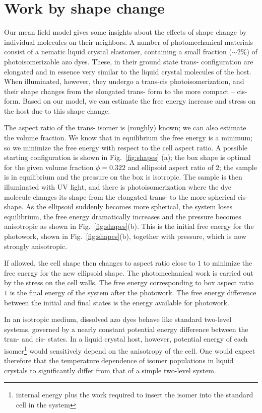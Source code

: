 \documentclass{article}
\begin{document}
\section{Work by shape change}

\label{Sec_Disscussion} Our mean field model gives some insights about the
effects of shape change by individual molecules on their neighbors. A number
of photomechanical materials consist of a nematic liquid crystal elastomer,
containing a small fraction ($\sim 2\%$) of photoisomerizable azo dyes.
These, in their ground state trans- configuration are elongated and in
essence very similar to the liquid crystal molecules of the host. When
illuminated, however, they undergo a trans-cis photoisomerization, and their
shape changes from the elongated trans- form to the more compact -- cis-
form. Based on our model, we can estimate the free energy increase and
stress on the host due to this shape change.

The aspect ratio of the trans- isomer is (roughly) known; we can also
estimate the volume fraction. We know that in equilibrium the free energy is
a minimum; so we minimize the free energy with respect to the cell aspect
ratio. A possible starting configuration is shown in Fig.~\ref{fig:shapes}%
(a); the box shape is optimal for the given volume fraction $\phi =0.322$
and ellipsoid aspect ratio of $2$; the sample is in equilibrium and the
pressure on the box is isotropic. The sample is then illuminated with UV
light, and there is photoisomerization where the dye molecule changes its
shape from the elongated trans- to the more spherical cis- shape. As the
ellipsoid suddenly becomes more spherical, the system loses equilibrium, the
free energy dramatically increases and the pressure becomes anisotropic as
shown in Fig.~\ref{fig:shapes}(b). This is the initial free energy for the
photowork, shown in Fig.~\ref{fig:shapes}(b), together with pressure, which
is now strongly anisotropic.

If allowed, the cell shape then changes to aspect ratio close to $1$ to
minimize the free energy for the new ellipsoid shape. The photomechanical
work is carried out by the stress on the cell walls. The free energy
corresponding to box aspect ratio $1$ is the final energy of the system
after the photowork. The free energy difference between the initial and
final states is the energy available for photowork.

In an isotropic medium, dissolved azo dyes behave like standard two-level
systems, governed by a nearly constant potential energy difference between
the tran- and cis- states. In a liquid crystal host, however, potential
energy of each isomer\footnote{%
internal energy plus the work required to insert the isomer into the
standard cell in the system} would sensitively depend on the anisotropy of
the cell. One would expect therefore that the temperature dependence of
isomer populations in liquid crystals to significantly differ from that of a
simple two-level system.
\end{document}
